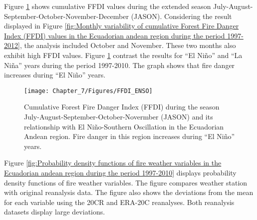 Figure \ref{fig:Cumulative Forest Fire Danger Index (FFDI) during the season July-August-September-October-Novermber (JASON) and its relationship with El Ni=0000F1o-Southern Oscillation in the Ecuadorian Andean region}
shows cumulative FFDI values during the extended season July-August-September-October-November-December
(JASON). Considering the result displayed in Figure \ref{fig:Monthly variability of cumulative Forest Fire Danger Index (FFDI) values in the Ecuadorian andean region during the period 1997-2012},
the analysis included October and November. These two months also
exhibit high FFDI values. Figure \ref{fig:Cumulative Forest Fire Danger Index (FFDI) during the season July-August-September-October-Novermber (JASON) and its relationship with El Ni=0000F1o-Southern Oscillation in the Ecuadorian Andean region}
contrast the results for \textquotedblleft El Ni\~no\textquotedblright{}
and \textquotedblleft La Ni\~na\textquotedblright{} years during the
period 1997-2010. The graph shows that fire danger increases during
\textquotedblleft El Ni\~no\textquotedblright{} years.

\begin{figure}[h]
\noindent \begin{centering}
\texttt{[image: Chapter\_7/Figures/FFDI\_ENSO]}
\par\end{centering}

\caption[Cumulative Forest Fire Danger Index (FFDI) during the season July-August-September-October-Novermber
(JASON) and its relationship with El Ni\~no-Southern Oscillation in
the Ecuadorian Andean region]{Cumulative Forest Fire Danger Index (FFDI) during the season July-August-September-October-Novermber
(JASON) and its relationship with El Ni\~no-Southern Oscillation in
the Ecuadorian Andean region. Fire danger in this region increases
during ``El Ni\~no'' years. \label{fig:Cumulative Forest Fire Danger Index (FFDI) during the season July-August-September-October-Novermber (JASON) and its relationship with El Ni=0000F1o-Southern Oscillation in the Ecuadorian Andean region} }


\end{figure}


Figure \ref{fig:Probability density functions of fire weather variables in the Ecuadorian andean region during the period 1997-2010}
displays probability density functions of fire weather variables.
The figure compares weather station with original reanalysis data.
The figure also shows the deviations from the mean for each variable
using the 20CR and ERA-20C reanalyses. Both reanalysis datasets display
large deviations. 

